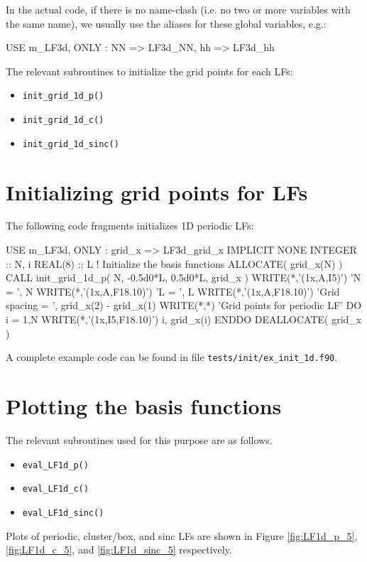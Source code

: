 In the actual code, if there is no name-clash (i.e. no two or more variables with the
same name), we usually use the aliases for these global variables, e.g.:
\begin{fortrancode}
USE m_LF3d, ONLY : NN => LF3d_NN, hh => LF3d_hh
\end{fortrancode}

The relevant subroutines to initialize the grid points for each LFs:
\begin{itemize}
\item \texttt{init\_grid\_1d\_p()}
\item \texttt{init\_grid\_1d\_c()}
\item \texttt{init\_grid\_1d\_sinc()}
\end{itemize}



\section{Initializing grid points for LFs}

The following code fragments initializes 1D periodic LFs:
\begin{fortrancode}
USE m_LF3d, ONLY : grid_x => LF3d_grid_x
IMPLICIT NONE
INTEGER :: N, i
REAL(8) :: L
! Initialize the basis functions
ALLOCATE( grid_x(N) )
CALL init_grid_1d_p( N, -0.5d0*L, 0.5d0*L, grid_x )
WRITE(*,'(1x,A,I5)') 'N = ', N
WRITE(*,'(1x,A,F18.10)') 'L = ', L
WRITE(*,'(1x,A,F18.10)') 'Grid spacing = ', grid_x(2) - grid_x(1)
WRITE(*,*) 'Grid points for periodic LF'
DO i = 1,N
  WRITE(*,'(1x,I5,F18.10)') i, grid_x(i)
ENDDO
DEALLOCATE( grid_x )
\end{fortrancode}

A complete example code can be found in file \texttt{tests/init/ex\_init\_1d.f90}.


\section{Plotting the basis functions}

The relevant subroutines used for this purpose are as follows.
\begin{itemize}
\item \texttt{eval\_LF1d\_p()}
\item \texttt{eval\_LF1d\_c()}
\item \texttt{eval\_LF1d\_sinc()}
\end{itemize}

Plots of periodic, cluster/box, and sinc LFs are
shown in Figure \ref{fig:LF1d_p_5}, \ref{fig:LF1d_c_5}, and
\ref{fig:LF1d_sinc_5} respectively.

